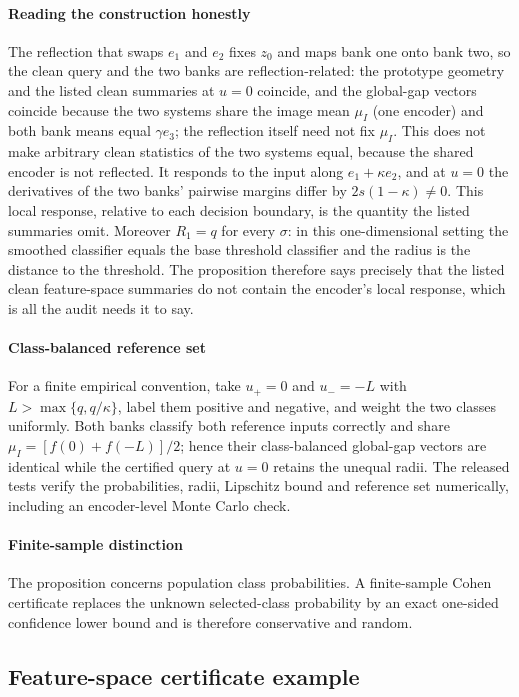 \paragraph{Reading the construction honestly}
The reflection that swaps $e_1$ and $e_2$ fixes $z_0$ and maps bank one onto
bank two, so the clean query and the two banks are reflection-related: the
prototype geometry and the listed clean summaries at $u=0$ coincide, and the
global-gap vectors coincide because the two systems share the image mean $\mu_I$
(one encoder) and both bank means equal $\gamma e_3$; the reflection itself need
not fix $\mu_I$. This does not make arbitrary clean statistics of the two
systems equal, because the shared encoder is not reflected. It responds to the
input along $e_1+\kappa e_2$, and at $u=0$ the derivatives of the two banks'
pairwise margins differ by $2s(1-\kappa)\neq0$. This local response, relative to
each decision boundary, is the quantity the listed summaries omit.
Moreover $R_1=q$ for every $\sigma$: in this one-dimensional setting the
smoothed classifier equals the base threshold classifier and the radius is the
distance to the threshold. The proposition therefore says precisely that the
listed clean feature-space summaries do not contain the encoder's local
response, which is all the audit needs it to say.

\paragraph{Class-balanced reference set}
For a finite empirical convention, take $u_+=0$ and $u_-=-L$ with
$L>\max\{q,q/\kappa\}$, label them positive and negative, and weight the two
classes uniformly.  Both banks classify both reference inputs correctly and
share $\mu_I=[f(0)+f(-L)]/2$; hence their class-balanced global-gap vectors are
identical while the certified query at $u=0$ retains the unequal radii. The
released tests verify the probabilities, radii, Lipschitz bound and reference
set numerically, including an encoder-level Monte Carlo check.

\paragraph{Finite-sample distinction}
The proposition concerns population class probabilities.  A finite-sample
Cohen certificate replaces the unknown selected-class probability by an exact
one-sided confidence lower bound and is therefore conservative and random.

\subsection{Feature-space certificate example}
\label{app:fss}

